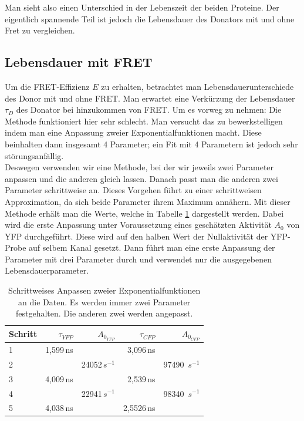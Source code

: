 Man sieht also einen Unterschied in der Lebenszeit der beiden Proteine. Der eigentlich spannende Teil 
ist jedoch die Lebensdauer des Donators mit und ohne Fret zu vergleichen.

\subsection{Lebensdauer mit FRET}

Um die FRET-Effizienz $E$ zu erhalten, betrachtet man Lebensdauerunterschiede des Donor mit und ohne FRET. 
Man erwartet eine Verkürzung der Lebensdauer $\tau_D$ des Donator bei hinzukommen von FRET. Um es vorweg zu nehmen: Die Methode funktioniert hier sehr schlecht. 
Man versucht das zu bewerkstelligen indem man eine Anpassung zweier Exponentialfunktionen macht. Diese beinhalten dann insgesamt 4 Parameter; 
ein Fit mit 4 Parametern ist jedoch sehr störungsanfällig.\\

Deswegen verwenden wir eine Methode, bei der wir jeweils zwei Parameter anpassen und die anderen gleich lassen. Danach passt man die anderen zwei 
Parameter schrittweise an. Dieses Vorgehen führt zu einer schrittweisen Approximation, da sich beide Parameter ihrem Maximum annähern. Mit dieser 
Methode erhält man die Werte, welche in Tabelle \ref{LTFit} dargestellt werden. Dabei wird die erste Anpassung unter Voraussetzung eines geschätzten Aktivität $A_0$ 
von YFP durchgeführt. Diese wird auf den halben Wert der Nullaktivität der YFP-Probe auf selbem Kanal gesetzt. Dann führt man eine erste Anpassung der 
Parameter mit drei Parameter durch und verwendet nur die ausgegebenen Lebensdauerparameter.\\

\begin{table}[h]
    \centering
    \begin{tabular}{l|rr||rr}
        \toprule
        Schritt & $\tau_{YFP}$ & $A_{0_{YFP}} $&  $\tau_{CFP}$ & $A_{0_{CFP}}$\\
        \midrule
        1 & 1,599\,ns & & 3,096\,ns& \\
        2 & & 24052\,$s^{-1}$ & & 97490 \,$s^{-1}$\\
        3 & 4,009\,ns & & 2,539\,ns& \\
        4 & & 22941\,$s^{-1}$ & & 98340 \,$s^{-1}$\\
        5 & 4,038\,ns & & 2,5526\,ns& \\  
        \bottomrule
    \end{tabular}
    \caption{Schrittweises Anpassen zweier Exponentialfunktionen an die Daten. Es werden immer zwei Parameter festgehalten. Die anderen zwei werden 
    angepasst.}
    \label{LTFit}
\end{table}

